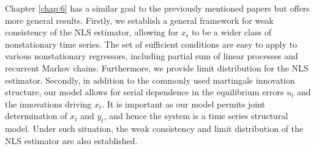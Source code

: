 Chapter \ref{chap:6} has a similar goal to the previously mentioned papers but offers more general results. Firstly, we establish a general framework for  weak consistency of the NLS estimator, allowing for $x_t$ to be  a  wider class of nonstationary time series. The set of sufficient conditions are easy to apply to various nonstationary regressors, including partial sum of linear processes and recurrent Markov chains. Furthermore, we  provide limit distribution for the NLS estimator. Secondly, in addition to the commonly used martingale innovation structure, our model allows for serial dependence in the equilibrium errors $u_t$ and the innovations driving $x_t$. It is important as our model  permits joint determination of $x_t$ and $y_t$, and hence the system is a time series structural model. Under such situation, the weak consistency and limit distribution of the NLS estimator are also established.





